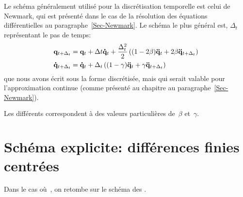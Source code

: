 \medskip
Le schéma généralement utilisé pour la discrétisation temporelle est celui de Newmark, qui est présenté dans le cas de la résolution des équations différentielles au paragraphe~\ref{Sec-Newmark}.
Le schéma le plus général est, $\Delta_t$ représentant le pas de temps:
\begin{equation}
\begin{aligned}
&\VV{q}_{t+\Delta_t} = \VV{q}_t + \Delta t \VV{\dot q}_t + \frac{\Delta_t^2}2\left((1-2\beta)\VV{\ddot q}_t
+2\beta\VV{\ddot q}_{t+\Delta_t}\right) \\
&\VV{\dot q}_{t+\Delta_t} = \VV{\dot q}_t+\Delta_t\left((1-\gamma)\VV{\ddot q}_t+\gamma\VV{\ddot q}_{t+\Delta_t}
\right)
\end{aligned}
\end{equation}
que nous avons écrit sous la forme discrétisée, mais qui serait valable pour l'approximation continue (comme présenté au chapitre au paragraphe~\ref{Sec-Newmark}).

Les différents  correspondent à des valeurs particulières de~$\beta$ et~$\gamma$.



\bigskip
\section{Schéma explicite: différences finies centrées}

Dans le cas où~, on retombe sur le schéma des .

